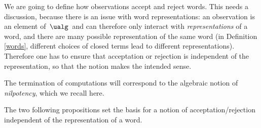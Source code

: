 We are going to define how observations accept and reject words.
This needs a discussion, because there is an issue with word representations: an observation is an element of $\,\ualg\,$ and can therefore only interact with \emph{representations} of a word, and there are many possible representation of the same word (in Definition \ref{words}, different choices of closed terms lead to different representations). Therefore one has to ensure that acceptation or rejection is independent of the representation, so that the notion makes the intended sense.

The termination of computations will correspond to the algebraic notion of \emph{nilpotency}, which we recall here.


The two following propositions set the basis for a notion of acceptation/rejection independent of the representation of a word.

